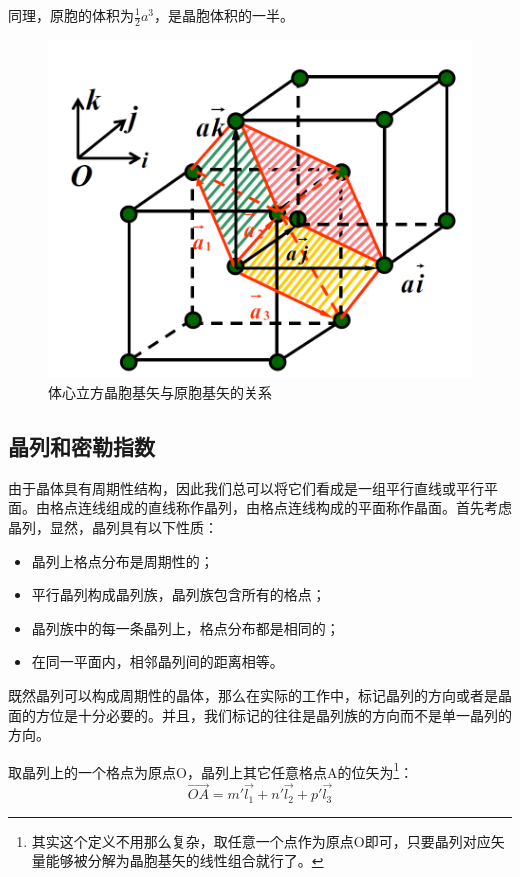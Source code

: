 \documentclass{ctexart}
\begin{document}
    同理，原胞的体积为$\frac{1}{2}a^3$，是晶胞体积的一半。
    \begin{figure}[H]
        \centering
        \includegraphics[height=\dimexpr\pagegoal-\pagetotal-4\baselineskip\relax,
  width=\textwidth,
  keepaspectratio]{figure/bcc.png}
        \caption{体心立方晶胞基矢与原胞基矢的关系}
        \label{fig:bcc}
    \end{figure}
    
    \subsection{晶列和密勒指数}
    由于晶体具有周期性结构，因此我们总可以将它们看成是一组平行直线或平行平面。由格点连线组成的直线称作晶列，由格点连线构成的平面称作晶面。首先考虑晶列，显然，晶列具有以下性质：
    \begin{itemize}
        \item 晶列上格点分布是周期性的；
        \item 平行晶列构成晶列族，晶列族包含所有的格点；
        \item 晶列族中的每一条晶列上，格点分布都是相同的；
        \item 在同一平面内，相邻晶列间的距离相等。
    \end{itemize}
    
    既然晶列可以构成周期性的晶体，那么在实际的工作中，标记晶列的方向或者是晶面的方位是十分必要的。并且，我们标记的往往是晶列族的方向而不是单一晶列的方向。
    
    取晶列上的一个格点为原点O，晶列上其它任意格点A的位矢为\footnote{其实这个定义不用那么复杂，取任意一个点作为原点O即可，只要晶列对应矢量能够被分解为晶胞基矢的线性组合就行了。}：
    \begin{equation}
        \Vec{OA}=m'\Vec{l_1}+n'\Vec{l_2}+p'\Vec{l_3}
    \end{equation}
    
\end{document}
